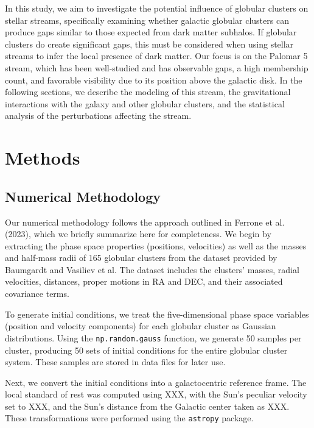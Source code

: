 \documentclass[]{aa}
\begin{document}
  In this study, we aim to investigate the potential influence of globular clusters on stellar streams, specifically examining whether galactic globular clusters can produce gaps similar to those expected from dark matter subhalos. If globular clusters do create significant gaps, this must be considered when using stellar streams to infer the local presence of dark matter. Our focus is on the Palomar 5 stream, which has been well-studied and has observable gaps, a high membership count, and favorable visibility due to its position above the galactic disk. In the following sections, we describe the modeling of this stream, the gravitational interactions with the galaxy and other globular clusters, and the statistical analysis of the perturbations affecting the stream.













\section{Methods}



  \subsection{Numerical Methodology}
    Our numerical methodology follows the approach outlined in Ferrone et al. (2023), which we briefly summarize here for completeness. We begin by extracting the phase space properties (positions, velocities) as well as the masses and half-mass radii of 165 globular clusters from the dataset provided by Baumgardt and Vasiliev et al. The dataset includes the clusters' masses, radial velocities, distances, proper motions in RA and DEC, and their associated covariance terms.

    To generate initial conditions, we treat the five-dimensional phase space variables (position and velocity components) for each globular cluster as Gaussian distributions. Using the \texttt{np.random.gauss} function, we generate 50 samples per cluster, producing 50 sets of initial conditions for the entire globular cluster system. These samples are stored in data files for later use.

    Next, we convert the initial conditions into a galactocentric reference frame. The local standard of rest was computed using XXX, with the Sun's peculiar velocity set to XXX, and the Sun's distance from the Galactic center taken as XXX. These transformations were performed using the \texttt{astropy} package.
\end{document}
